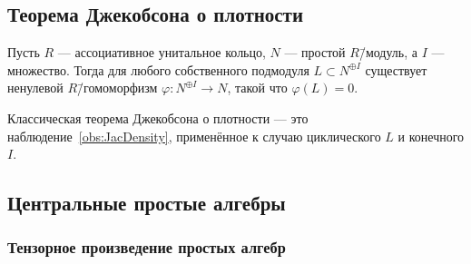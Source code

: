 \documentclass[
	extrafontsizes,
	11pt,
	hyphens,
]{memoir}
\begin{document}
\subsection{Теорема Джекобсона о плотности}

\begin{observation}
Пусть \(R\) --- ассоциативное унитальное кольцо,
\(N\) --- простой \(R\)\=/модуль,
а \(I\) --- множество.%
\label{obs:JacDensity}
Тогда для любого собственного подмодуля \(L \subset N^{\oplus I}\) существует ненулевой \(R\)\=/гомоморфизм \(\varphi : N^{\oplus I} \to N\), такой что \(\varphi(L) = 0\).
\end{observation}

\begin{remark}
Классическая теорема Джекобсона о плотности --- это наблюдение~\ref{obs:JacDensity}, применённое к случаю циклического \(L\) и конечного \(I\).
\end{remark}

%
%

\subsection{Центральные простые алгебры}

\subsubsection{Тензорное произведение простых алгебр}
\end{document}
